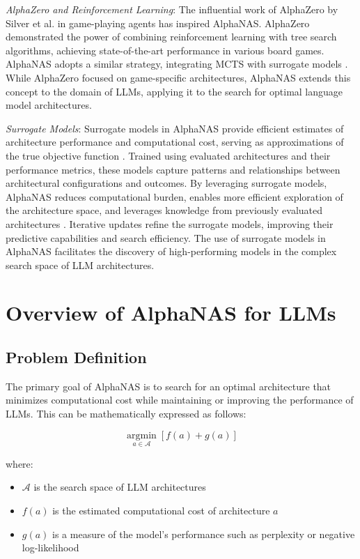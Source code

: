 \documentclass{article}
\begin{document}
\textit{AlphaZero and Reinforcement Learning}: The influential work of AlphaZero by Silver et al. \cite{silver2017mastering} in game-playing agents has inspired AlphaNAS. AlphaZero demonstrated the power of combining reinforcement learning with tree search algorithms, achieving state-of-the-art performance in various board games. AlphaNAS adopts a similar strategy, integrating MCTS with surrogate models \cite{wang2019neural, wang2019alphax}. While AlphaZero focused on game-specific architectures, AlphaNAS extends this concept to the domain of LLMs, applying it to the search for optimal language model architectures.

\textit{Surrogate Models}: Surrogate models in AlphaNAS provide efficient estimates of architecture performance and computational cost, serving as approximations of the true objective function \cite{NegrinhoG17}. Trained using evaluated architectures and their performance metrics, these models capture patterns and relationships between architectural configurations and outcomes. By leveraging surrogate models, AlphaNAS reduces computational burden, enables more efficient exploration of the architecture space, and leverages knowledge from previously evaluated architectures \cite{wang2019neural, wang2019alphax}. Iterative updates refine the surrogate models, improving their predictive capabilities and search efficiency. The use of surrogate models in AlphaNAS facilitates the discovery of high-performing models in the complex search space of LLM architectures.
\section{Overview of AlphaNAS for LLMs}

\subsection{Problem Definition}
The primary goal of AlphaNAS is to search for an optimal architecture that minimizes computational cost while maintaining or improving the performance of LLMs. This can be mathematically expressed as follows:

\begin{equation}
\underset{a \in \mathcal{A}}{\operatorname{argmin}} [f(a) + g(a)]
\end{equation}

where:
\begin{itemize}
\item $\mathcal{A}$ is the search space of LLM architectures
\item $f(a)$ is the estimated computational cost of architecture $a$
\item $g(a)$ is a measure of the model's performance such as perplexity or negative log-likelihood
\end{itemize}
\end{document}
